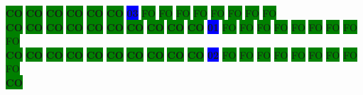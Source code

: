 \colorbox{green}{\color[rgb]{0,0,0}\textbf{CO}}%
\colorbox{green}{\color[rgb]{0,0,0}\textbf{CO}}%
\colorbox{green}{\color[rgb]{0,0,0}\textbf{CO}}%
\colorbox{green}{\color[rgb]{0,0,0}\textbf{CO}}%
\colorbox{green}{\color[rgb]{0,0,0}\textbf{CO}}%
\colorbox{green}{\color[rgb]{0,0,0}\textbf{CO}}%
\colorbox{blue}{\color[rgb]{1,0,0}\textbf{03}}%
\colorbox{green}{\color[gray]{0.75}FO}%
\colorbox{green}{\color[gray]{0.75}FO}%
\colorbox{green}{\color[gray]{0.75}FO}%
\colorbox{green}{\color[gray]{0.75}FO}%
\colorbox{green}{\color[gray]{0.75}FO}%
\colorbox{green}{\color[gray]{0.75}FO}%
\colorbox{green}{\color[gray]{0.75}FO}%
\colorbox{green}{\color[gray]{0.75}FO}%
\\
\colorbox{green}{\color[rgb]{0,0,0}\textbf{CO}}%
\colorbox{green}{\color[rgb]{0,0,0}\textbf{CO}}%
\colorbox{green}{\color[rgb]{0,0,0}\textbf{CO}}%
\colorbox{green}{\color[rgb]{0,0,0}\textbf{CO}}%
\colorbox{green}{\color[rgb]{0,0,0}\textbf{CO}}%
\colorbox{green}{\color[rgb]{0,0,0}\textbf{CO}}%
\colorbox{green}{\color[rgb]{0,0,0}\textbf{CO}}%
\colorbox{green}{\color[rgb]{0,0,0}\textbf{CO}}%
\colorbox{green}{\color[rgb]{0,0,0}\textbf{CO}}%
\colorbox{green}{\color[rgb]{0,0,0}\textbf{CO}}%
\colorbox{blue}{\color[rgb]{1,0,0}\textbf{01}}%
\colorbox{green}{\color[gray]{0.75}FO}%
\colorbox{green}{\color[gray]{0.75}FO}%
\colorbox{green}{\color[gray]{0.75}FO}%
\colorbox{green}{\color[gray]{0.75}FO}%
\colorbox{green}{\color[gray]{0.75}FO}%
\colorbox{green}{\color[gray]{0.75}FO}%
\colorbox{green}{\color[gray]{0.75}FO}%
\colorbox{green}{\color[gray]{0.75}FO}%
\colorbox{green}{\color[gray]{0.75}FO}%
\\
\colorbox{green}{\color[rgb]{0,0,0}\textbf{CO}}%
\colorbox{green}{\color[rgb]{0,0,0}\textbf{CO}}%
\colorbox{green}{\color[rgb]{0,0,0}\textbf{CO}}%
\colorbox{green}{\color[rgb]{0,0,0}\textbf{CO}}%
\colorbox{green}{\color[rgb]{0,0,0}\textbf{CO}}%
\colorbox{green}{\color[rgb]{0,0,0}\textbf{CO}}%
\colorbox{green}{\color[rgb]{0,0,0}\textbf{CO}}%
\colorbox{green}{\color[rgb]{0,0,0}\textbf{CO}}%
\colorbox{green}{\color[rgb]{0,0,0}\textbf{CO}}%
\colorbox{green}{\color[rgb]{0,0,0}\textbf{CO}}%
\colorbox{blue}{\color[rgb]{1,0,0}\textbf{02}}%
\colorbox{green}{\color[gray]{0.75}FO}%
\colorbox{green}{\color[gray]{0.75}FO}%
\colorbox{green}{\color[gray]{0.75}FO}%
\colorbox{green}{\color[gray]{0.75}FO}%
\colorbox{green}{\color[gray]{0.75}FO}%
\colorbox{green}{\color[gray]{0.75}FO}%
\colorbox{green}{\color[gray]{0.75}FO}%
\colorbox{green}{\color[gray]{0.75}FO}%
\colorbox{green}{\color[gray]{0.75}FO}%
\\
\colorbox{green}{\color[rgb]{0,0,0}\textbf{CO}}%
